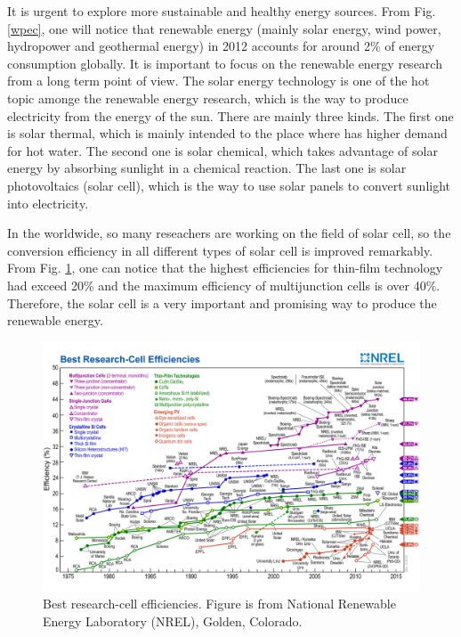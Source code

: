 \documentclass[a4paper, 12pt, titlepage,oneside,drop]{kthesis}
\begin{document}
It is urgent to explore more sustainable and healthy energy sources. From Fig. \ref{wpec}, one will notice that renewable energy (mainly solar energy, wind power, hydropower and 
geothermal energy) in 2012 accounts for around 2\% of energy consumption globally. It is important to focus on the renewable energy research from a long term point of view. The solar energy technology is one of the hot topic amonge the renewable energy research, 
which is the way to produce electricity from the energy of the sun. There are mainly three kinds. The first one is solar thermal, which is mainly
intended to the place where has higher demand for hot water. The second one is solar chemical, which takes advantage of solar energy by absorbing sunlight in a chemical reaction.
The last one is solar photovoltaics (solar cell), which is the way to use solar panels to convert sunlight into electricity. 



In the worldwide, so many reseachers are working on the field of solar cell, so the conversion efficiency in all different types of solar cell is improved remarkably. 
From Fig. \ref{nrel}, one can notice that the highest efficiencies for thin-film technology had exceed 20\% and the maximum efficiency of multijunction cells is over 40\%.
Therefore, the solar cell is a very important and promising way to produce the renewable energy.

\begin{figure}[H]
\centering
\includegraphics[scale=0.16]{efficiency_chart.jpg}
\caption{Best research-cell efficiencies. Figure is from National Renewable Energy Laboratory (NREL), Golden, Colorado.}
\label{nrel}
\end{figure}
\end{document}
